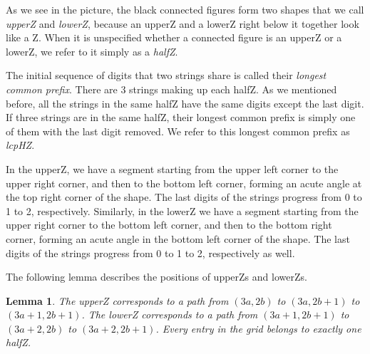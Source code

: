 \documentclass[12pt,reqno]{article}
\theoremstyle{plain}
\newtheorem{lemma}[theorem]{Lemma}
\theoremstyle{definition}
\theoremstyle{remark}
\begin{document}
As we see in the picture, the black connected figures form two shapes that we call \textit{upperZ} and \textit{lowerZ}, because an upperZ and a lowerZ right below it together look like a Z. When it is unspecified whether a connected figure is an upperZ or a lowerZ, we refer to it simply as a \textit{halfZ}. 

The initial sequence of digits that two strings share is called their \textit{longest common prefix}.
There are 3 strings making up each halfZ. As we mentioned before, all the strings in the same halfZ have the same digits except the last digit. If three strings are in the same halfZ, their longest common prefix is simply one of them with the last digit removed. We refer to this longest common prefix as \textit{lcpHZ}.

In the upperZ, we have a segment starting from the upper left corner to the upper right corner, and then to the bottom left corner, forming an acute angle at the top right corner of the shape. The last digits of the strings progress from 0 to 1 to 2, respectively. 
Similarly, in the lowerZ we have a segment starting from the upper right corner to the bottom left corner, and then to the bottom right corner, forming an acute angle in the bottom left corner of the shape. The last digits of the strings progress from 0 to 1 to 2, respectively as well. 


The following lemma describes the positions of upperZs and lowerZs.

\begin{lemma}
The upperZ corresponds to a path from $(3a,2b)$ to $(3a,2b+1)$ to $(3a+1,2b+1)$. The lowerZ corresponds to a path from $(3a+1,2b+1)$ to $(3a+2,2b)$ to $(3a+2,2b+1)$. Every entry in the grid belongs to exactly one halfZ.
\end{lemma}
\end{document}
